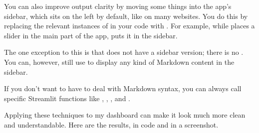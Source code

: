 \documentclass[letterpaper,10pt,english]{jupyterBook}
\begin{document}
\begin{sphinxVerbatim}[commandchars=\\\{\}]
 




 
\end{sphinxVerbatim}

\sphinxAtStartPar
You can also improve output clarity by moving some things into the app’s sidebar, which sits on the left by default, like on many websites.  You do this by replacing the relevant instances of  in your code with .  For example, while  places a slider in the main part of the app,  puts it in the sidebar.

\sphinxAtStartPar
The one exception to this is that  does not have a sidebar version; there is no .  You can, however, still use  to display any kind of Markdown content in the sidebar.

\sphinxAtStartPar
If you don’t want to have to deal with Markdown syntax, you can always call specific Streamlit functions like , , , and .

\sphinxAtStartPar
Applying these techniques to my dashboard can make it look much more clean and understandable.  Here are the results, in code and in a screenshot.
\end{document}
